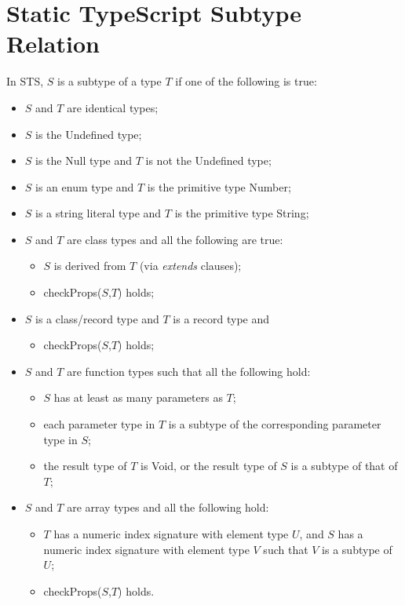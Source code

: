 
\pagebreak
\appendix
\section{Static TypeScript Subtype Relation}


In STS, $S$ is a subtype of a type $T$ if one of the following is true:
\begin{itemize}
\item $S$ and $T$ are identical types;
\item $S$ is the Undefined type;
\item $S$ is the Null type and $T$ is not the Undefined type;
\item $S$ is an enum type and $T$ is the primitive type Number;
\item $S$ is a string literal type and $T$ is the primitive type String;
\item $S$ and $T$ are class types and all the following are true:
\begin{itemize}
  \item $S$ is derived from $T$ (via \emph{extends} clauses);
  \item checkProps($S$,$T$) holds;
\end{itemize}
\item $S$ is a class/record type and $T$ is a record type and
\begin{itemize}
  \item checkProps($S$,$T$) holds;
\end{itemize}
\item $S$ and $T$ are function types such that all the following hold:
\begin{itemize}
  \item $S$ has at least as many parameters as $T$;
  \item each parameter type in $T$ is a subtype of the corresponding parameter type in $S$;
  \item the result type of $T$ is Void, or the result type of $S$ is a subtype of that of $T$;
\end{itemize}
\item $S$ and $T$ are array types and all the following hold:
\begin{itemize}
\item $T$ has a numeric index signature with element type $U$,
    and $S$ has a numeric index signature with element type $V$
    such that $V$ is a subtype of $U$;
\item checkProps($S$,$T$) holds.
\end{itemize}
\end{itemize}

